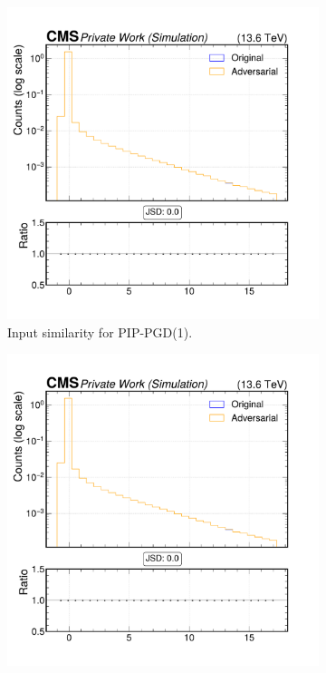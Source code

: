 \begin{figure}[h]
  \centering
  \begin{subfigure}[t]{0.32\textwidth}
    \includegraphics[width=\linewidth]{media/output/features/compare/combined_it_1/cmp_cpf_arr_Cpfcan_BtagPf_trackSip3dVal.pdf}
    \caption*{Input similarity for PIP-PGD(1).}
  \end{subfigure}\hfill
  \begin{subfigure}[t]{0.32\textwidth}
    \includegraphics[width=\linewidth]{media/output/features/compare/combined_it_2/cmp_cpf_arr_Cpfcan_BtagPf_trackSip3dVal.pdf}

\end{subfigure}
\end{figure}
